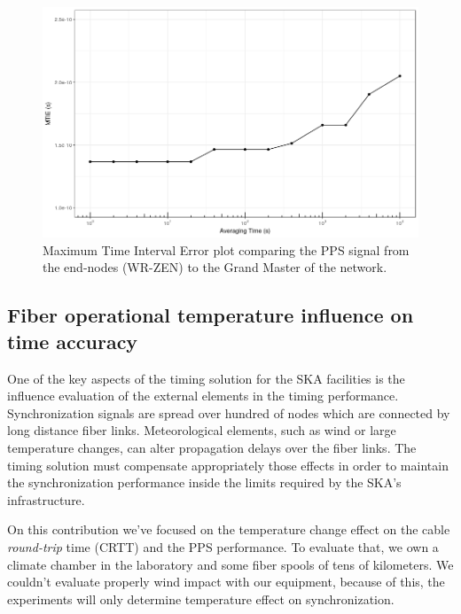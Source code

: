 \begin{figure}
	\centering
	\includegraphics[width=0.9\linewidth]{img/MTIE_exp3}
	\caption[MTIE of the end-nodes in the scalability test.]{Maximum Time 
	Interval Error
	plot comparing the PPS signal from the end-nodes (WR-ZEN) to the Grand 
	Master of the network.}
	\label{fig:mtienet}
\end{figure}

\subsection{Fiber operational temperature influence on time accuracy}
\label{subsec:temp}

One of the key aspects of the timing solution for the SKA facilities is the 
influence evaluation of the external elements in the timing performance. 
Synchronization signals are spread over hundred of nodes which are connected by 
long distance fiber links. Meteorological elements, such as wind or large 
 temperature changes, can alter propagation delays over the fiber 
links. The timing solution must compensate appropriately those effects in order 
to maintain the synchronization performance inside the limits required by the 
SKA's infrastructure.

On this contribution we've focused on the temperature change effect on the cable
\textit{round-trip} time (CRTT) and the PPS performance. To evaluate that, we 
own a climate chamber in the laboratory and some fiber spools of tens of 
kilometers. 
We couldn't evaluate properly wind impact with our equipment, because of this, 
the experiments will only determine temperature effect on synchronization.


